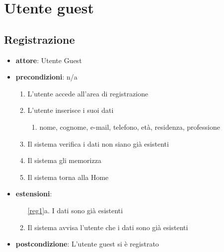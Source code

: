 \chapter{Utente guest}


\section{Registrazione}
\begin{itemize}
    \item \textbf{attore}: Utente Guest
    \item \textbf{precondizioni}: n/a
    
    \begin{enumerate}
        \item L’utente accede all’area di registrazione
        \item L’utente inserisce i suoi dati
        \label{reg1}
        \begin{enumerate}
            \item nome, cognome, e-mail, telefono, età, residenza, professione
        \end{enumerate}
        \item Il sistema verifica i dati non siano già esistenti
        \item Il sistema gli memorizza
        \item Il sistema torna alla Home
    \end{enumerate}

    \item \textbf{estensioni}:
    \begin{enumerate}
        \item[\ref{reg1}a.] I dati sono già esistenti
        \item Il sistema avvisa l’utente che i dati sono già esistenti
    \end{enumerate}

    \item \textbf{postcondizione}: L’utente guest si è registrato
\end{itemize}
